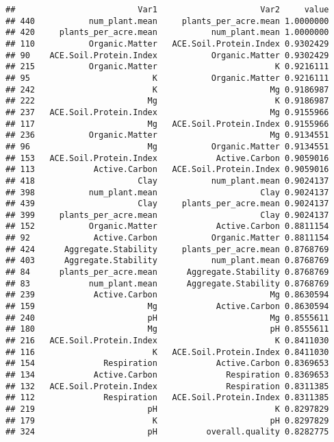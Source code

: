 \documentclass[]{article}
\begin{document}
\begin{verbatim}
##                         Var1                     Var2     value
## 440           num_plant.mean     plants_per_acre.mean 1.0000000
## 420     plants_per_acre.mean           num_plant.mean 1.0000000
## 110           Organic.Matter   ACE.Soil.Protein.Index 0.9302429
## 90    ACE.Soil.Protein.Index           Organic.Matter 0.9302429
## 215           Organic.Matter                        K 0.9216111
## 95                         K           Organic.Matter 0.9216111
## 242                        K                       Mg 0.9186987
## 222                       Mg                        K 0.9186987
## 237   ACE.Soil.Protein.Index                       Mg 0.9155966
## 117                       Mg   ACE.Soil.Protein.Index 0.9155966
## 236           Organic.Matter                       Mg 0.9134551
## 96                        Mg           Organic.Matter 0.9134551
## 153   ACE.Soil.Protein.Index            Active.Carbon 0.9059016
## 113            Active.Carbon   ACE.Soil.Protein.Index 0.9059016
## 418                     Clay           num_plant.mean 0.9024137
## 398           num_plant.mean                     Clay 0.9024137
## 439                     Clay     plants_per_acre.mean 0.9024137
## 399     plants_per_acre.mean                     Clay 0.9024137
## 152           Organic.Matter            Active.Carbon 0.8811154
## 92             Active.Carbon           Organic.Matter 0.8811154
## 424      Aggregate.Stability     plants_per_acre.mean 0.8768769
## 403      Aggregate.Stability           num_plant.mean 0.8768769
## 84      plants_per_acre.mean      Aggregate.Stability 0.8768769
## 83            num_plant.mean      Aggregate.Stability 0.8768769
## 239            Active.Carbon                       Mg 0.8630594
## 159                       Mg            Active.Carbon 0.8630594
## 240                       pH                       Mg 0.8555611
## 180                       Mg                       pH 0.8555611
## 216   ACE.Soil.Protein.Index                        K 0.8411030
## 116                        K   ACE.Soil.Protein.Index 0.8411030
## 154              Respiration            Active.Carbon 0.8369653
## 134            Active.Carbon              Respiration 0.8369653
## 132   ACE.Soil.Protein.Index              Respiration 0.8311385
## 112              Respiration   ACE.Soil.Protein.Index 0.8311385
## 219                       pH                        K 0.8297829
## 179                        K                       pH 0.8297829
## 324                       pH          overall.quality 0.8282775

\end{verbatim}
\end{document}

